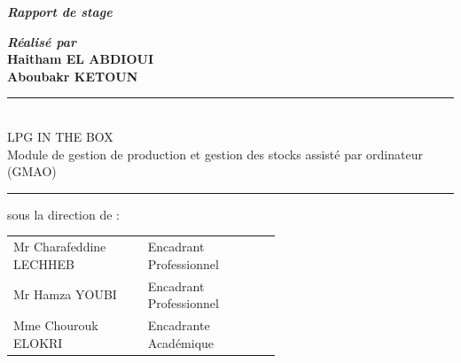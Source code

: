 \documentclass[a4paper, oneside, 12pt, final]{extreport}
\newcommand{\reportTitle} {%
  \textsc{Projet de EMSI IT SUMMER COMPETION 2024}
}
\newcommand{\reportAuthor} {%
  Haitham \textsc{EL ABDIOUI}\\
  Aboubakr \textsc{KETOUN}%
}
\newcommand{\reportSubject} {%
  \textsc{LPG IN THE BOX} \\ 
  Module de gestion de production et gestion des stocks assisté par ordinateur (GMAO)%
}
\newcommand{\dateSoutenance} {%
  2024%
}
\newcommand{\juryMemberOne} {%
  Mr Charafeddine \textsc{LECHHEB}%
}
\newcommand{\juryMemberOneDesc} {%
  Encadrant Professionnel
}
\newcommand{\juryMemberTwo} {%
  Mr Hamza \textsc{YOUBI}%
}
\newcommand{\juryMemberTwoDesc} {%
  Encadrant Professionnel
}
\newcommand{\juryMemberThree} {%
	Mme Chourouk \textsc{ELOKRI}%
}
\newcommand{\juryMemberThreeDesc} {%
	Encadrante Académique
}
\begin{document}
\begin{titlepage}
\begin{center}

\vspace{30pt} {%
  \renewcommand*{\familydefault}{\defaultFont}
  \fontsize{46pt}{46pt}\selectfont%
}

\vspace{10pt}
\textbf{\textit{Rapport de stage}}


\vspace{30pt}
\textbf{\textit{Réalisé par}}\\
\vspace{10pt} {%
  \fontsize{18pt}{18pt}\selectfont%
  \textbf{\reportAuthor}\\
}%

\vspace{10pt} {%
  \renewcommand*{\familydefault}{\defaultFont}
  \fontsize{27pt}{27pt}\selectfont%
  \rule{0.5\textwidth}{.4pt}\\
  \vspace{10pt}
  \reportSubject{}\\%
  \vspace{10pt}
  \rule{0.5\textwidth}{.4pt}
}


\vspace{10pt}
sous la direction de :\\
\vspace{20pt}

\vspace{10pt}
\begin{tabular}{p{0.3\linewidth} p{0.3\linewidth}}
  \juryMemberOne{} & \juryMemberOneDesc{}\\
  \juryMemberTwo{} & \juryMemberTwoDesc{}\\
 \juryMemberThree{} & \juryMemberThreeDesc{}\\
\end{tabular}


\end{center}
\end{titlepage}
\end{document}
